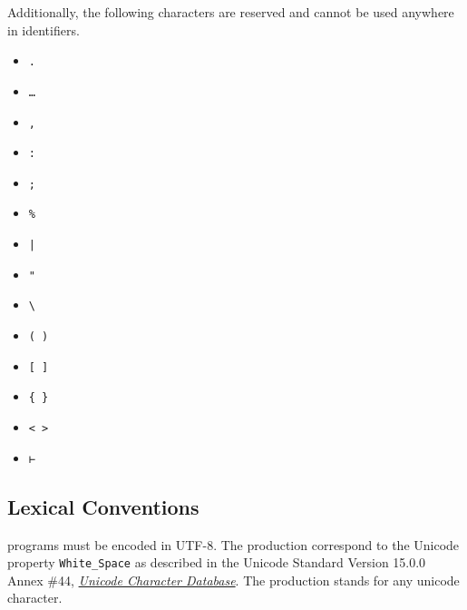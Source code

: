 Additionally, the following characters are reserved and cannot be used anywhere in identifiers.

{\setlength{\columnseprule}{0.4pt}
\begin{multicols}{3}
\begin{itemize}[label={}]
\item \texttt{.}
\item \texttt{…}
\item \texttt{,}
\item \texttt{:}
\item \texttt{;}
\item \texttt{\%}
\item \texttt{|}
\item \texttt{"}
\item \texttt{\textbackslash}
\item \texttt{( )}
\item \texttt{[ ]}
\item \texttt{\{ \}}
\item \texttt{< >}
\item \texttt{⊢}
\end{itemize}
\end{multicols}
}

\subsection{Lexical Conventions}

\Beluga programs must be encoded in \textsc{UTF-8}.
The production  correspond to the Unicode property \texttt{White\_Space} as described in the Unicode Standard Version 15.0.0 Annex \#44, \href{https://www.unicode.org/reports/tr44/tr44-30.html#White_Space}{\textit{Unicode Character Database}}.
The production  stands for any unicode character.

